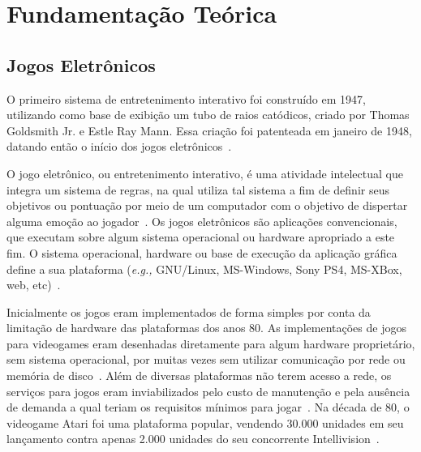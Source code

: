 \chapter{Fundamentação Teórica}
\label{cap2}



\section{Jogos Eletrônicos}



O primeiro sistema de entretenimento interativo foi construído em 1947, utilizando como base de exibição um tubo de raios catódicos, criado por Thomas Goldsmith Jr. e Estle Ray Mann.
%
Essa criação foi patenteada em janeiro de 1948, datando então o início dos jogos eletrônicos~\cite{Adams2014Jan, patents1947Jan}.



O jogo eletrônico, ou entretenimento interativo, é uma atividade intelectual que integra um sistema de regras, na qual utiliza tal sistema a fim de definir seus objetivos ou pontuação por meio de um computador com o objetivo de dispertar alguma emoção ao jogador~\cite{video_game_technologies}.
%
Os jogos eletrônicos são aplicações convencionais, que executam sobre algum sistema operacional ou hardware apropriado a este fim.
%
O sistema operacional, hardware ou base de execução da aplicação gráfica define a sua plataforma (\textit{e.g.,} GNU/Linux, MS-Windows, Sony PS4, MS-XBox, web, etc)~\cite{adams_1208533}.



Inicialmente os jogos eram implementados de forma simples por conta da limitação de hardware das plataformas dos anos 80.
%
As implementações de jogos para videogames eram desenhadas diretamente para algum hardware proprietário, sem sistema operacional, por muitas vezes sem utilizar comunicação por rede ou memória de disco~\cite{rollings2003andrew}.
%
Além de diversas plataformas não terem acesso a rede, os serviços para jogos eram inviabilizados pelo custo de manutenção e pela ausência de demanda a qual teriam os requisitos mínimos para jogar~\cite{adams_1208533}.
%
Na década de 80, o videogame Atari foi uma plataforma popular, vendendo 30.000 unidades em seu lançamento contra apenas 2.000 unidades do seu concorrente Intellivision~\cite{atari_age}.




